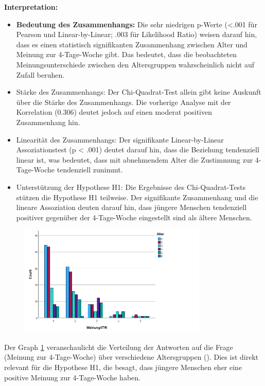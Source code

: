 \textbf{Interpretation:}
\begin{itemize}
    \item \textbf{Bedeutung des Zusammenhangs: }Die sehr niedrigen p-Werte (<.001 für Pearson und 
    Linear-by-Linear; .003 für Likelihood Ratio) weisen darauf hin, dass es einen statistisch 
    signifikanten Zusammenhang zwischen Alter und Meinung zur 4-Tage-Woche gibt. Das bedeutet, dass 
    die beobachteten Meinungsunterschiede zwischen den Altersgruppen wahrscheinlich nicht auf Zufall 
    beruhen.
    \item Stärke des Zusammenhangs: Der Chi-Quadrat-Test allein gibt keine Auskunft über die Stärke 
    des Zusammenhangs. Die vorherige Analyse mit der Korrelation (0.306) deutet jedoch auf einen 
    moderat positiven Zusammenhang hin.
    \item Linearität des Zusammenhangs: Der signifikante Linear-by-Linear Assoziationstest (p < .001) 
    deutet darauf hin, dass die Beziehung tendenziell linear ist, was bedeutet, dass mit abnehmendem 
    Alter die Zustimmung zur 4-Tage-Woche tendenziell zunimmt.
    \item Unterstützung der Hypothese H1: Die Ergebnisse des Chi-Quadrat-Tests stützen die Hypothese 
    H1 teilweise. Der signifikante Zusammenhang und die lineare Assoziation deuten darauf hin, dass 
    jüngere Menschen tendenziell positiver gegenüber der 4-Tage-Woche eingestellt sind als ältere 
    Menschen.
\end{itemize}

\begin{figure}[h]
    \centering
    \includegraphics[width=0.8\textwidth]{04_Artefakte/01_Abbildungen/hypothese_1/h1_graph.png}
    \caption{}
    \label{fig:h1_graph}
\end{figure}

Der Graph \ref{fig:h1_graph} veranschaulicht die Verteilung der Antworten auf die Frage 
(Meinung zur 4-Tage-Woche) über verschiedene Altersgruppen (). Dies ist direkt relevant für 
die Hypothese H1, die besagt, dass jüngere Menschen eher eine positive Meinung zur 4-Tage-Woche haben.



